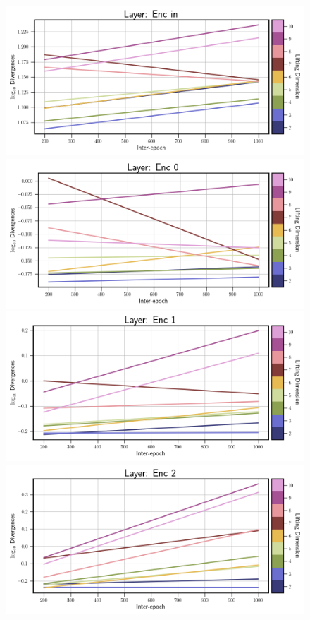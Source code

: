 \begin{figure}[!htbp]
    \centering
    \begin{minipage}{.5\textwidth}
        \includegraphics[width=\textwidth]{"../Figures/duffing_div_plot_linear_enc_in.png"} 
        \includegraphics[width=\textwidth]{"../Figures/duffing_div_plot_linear_enc_0.png"} 
        \includegraphics[width=\textwidth]{"../Figures/duffing_div_plot_linear_enc_1.png"} 
        \includegraphics[width=\textwidth]{"../Figures/duffing_div_plot_linear_enc_2.png"} 

\end{minipage}
\end{figure}
